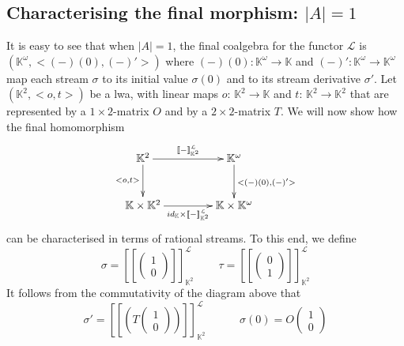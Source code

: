 \documentclass[3p]{elsarticle}
\newcommand{\cbox}[1]{\vspace{0.2cm}\noindent
  \fbox{\parbox{.97\textwidth}{#1}}\vspace{0.2cm}}
\newcommand{\X}{\mathcal{X}}           %
\newcommand{\fL}{\mathcal{L}}    %
\newcommand{\vectproduct}{\times} %
\newcommand{\streamproduct}{\times} %
\newcommand{\beh}[3]{\left[\!\left[ #1 \right]\!\right]^{#2}_{#3}} %
\newcommand{\K}{\mathbb{K}}            %
\newcommand{\lwa}{{\sc lwa}}           %
\begin{document}


\subsection{Characterising the final morphism: $|A|=1$}
\label{Characterising the final morphism ($|A|=1$}

It is easy to see that when $|A|=1$, the final coalgebra for the functor $\fL$ is $(\K^{\omega}, <(-)(0), (-)'>)$ where $(-)(0):\K^{\omega} \to \K$
and $(-)': \K^{\omega} \to \K^{\omega}$ map each stream $\sigma$ to  its initial value $\sigma(0)$ and to its stream derivative $\sigma'$.
Let  $(\K^2 , <o,t>)$ be a \lwa,
with linear maps $o: \, \K^2 \to \K$ and $t: \, \K^2 \to \K^2$ that are represented by a $1 \times 2$-matrix $O$ and by a $2
\times 2$-matrix $T$.
We will now show how the final homomorphism
\[
\xymatrix@+1.0ex@C+3.6ex{ \K^2 \dto_-{ <o,t>}
\ar[r]^-{\beh{-}{\fL}{\K^2}} & \K^\omega \dto^{<(-)(0), (-)'>}
\\
\K \vectproduct \K^2 \rto_-{ id_{\K} \vectproduct \beh{-}{\fL}{\K^2} }
& \K \vectproduct \K^\omega }
\]
can be
characterised in terms of rational streams.
To this end, we define
\[
\sigma = \beh{\begin{pmatrix} 1 \\ 0
\end{pmatrix}}{\fL}{\K^2} \;\;\;\;\;\;\;\;
\tau = \beh{\begin{pmatrix} 0 \\ 1
\end{pmatrix}}{\fL}{\K^2}
\]
%
It follows from the commutativity of the diagram above that
\[
\sigma'=\beh{(T
%
\left(%
\begin{array}{c}
  1 \\
  0
\end{array}\right))}{\fL}{\K^2}
\;\;\;\;\;\;\;\;\;\;\; \sigma(0)=O \left(%
\begin{array}{c}
  1 \\
  0
\end{array}\right)
\]
\end{document}
